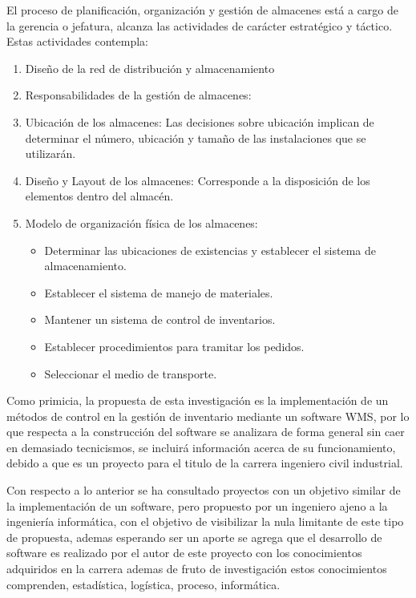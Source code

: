 \documentclass[
]{article}
\providecommand{\tightlist}{%
  \setlength{\itemsep}{0pt}\setlength{\parskip}{0pt}}
\begin{document}
El proceso de planificación, organización y gestión de almacenes está a
cargo de la gerencia o jefatura, alcanza las actividades de carácter
estratégico y táctico. Estas actividades contempla:

\begin{enumerate}
\def\labelenumi{\arabic{enumi}.}
\item
  Diseño de la red de distribución y almacenamiento
\item
  Responsabilidades de la gestión de almacenes:
\item
  Ubicación de los almacenes: Las decisiones sobre ubicación implican de
  determinar el número, ubicación y tamaño de las instalaciones que se
  utilizarán.
\item
  Diseño y Layout de los almacenes: Corresponde a la disposición de los
  elementos dentro del almacén.
\item
  Modelo de organización física de los almacenes:

  \begin{itemize}
  \tightlist
  \item
    Determinar las ubicaciones de existencias y establecer el sistema de
    almacenamiento.
  \item
    Establecer el sistema de manejo de materiales.
  \item
    Mantener un sistema de control de inventarios.
  \item
    Establecer procedimientos para tramitar los pedidos.
  \item
    Seleccionar el medio de transporte.
  \end{itemize}
\end{enumerate}

Como primicia, la propuesta de esta investigación es la implementación
de un métodos de control en la gestión de inventario mediante un
software WMS, por lo que respecta a la construcción del software se
analizara de forma general sin caer en demasiado tecnicismos, se
incluirá información acerca de su funcionamiento, debido a que es un
proyecto para el titulo de la carrera ingeniero civil industrial.

Con respecto a lo anterior se ha consultado proyectos con un objetivo
similar de la implementación de un software, pero propuesto por un
ingeniero ajeno a la ingeniería informática, con el objetivo de
visibilizar la nula limitante de este tipo de propuesta, ademas
esperando ser un aporte se agrega que el desarrollo de software es
realizado por el autor de este proyecto con los conocimientos adquiridos
en la carrera ademas de fruto de investigación estos conocimientos
comprenden, estadística, logística, proceso, informática.
\end{document}
